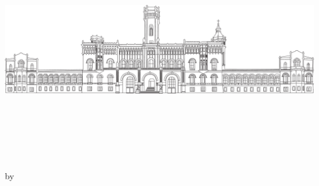 \begin{titlepage}
	\begin{addmargin}[-1cm]{-3cm}
	\vspace{1cm}
    \begin{center}
    	\includegraphics[width=13.8cm]{gfx/welfenschloss}
        \large  

        \hfill

        \begingroup
            \huge{}\LARGE{}
            \huge{}\LARGE{}
            \huge{}\LARGE{} \\
        \endgroup
		\smallskip
        \normalsize
        \myFaculty \\
        \myDepartment

        \vfill
        
        \LARGE {\color{LUHblue}\spacedallcaps \myTitle} \\
        \vfill
        \Large \myDegree \\
        \vfill
        
        \large by \\ %
        \smallskip
        \large \spacedallcaps{\myName} \\
        \smallskip
        \large \myTime \\ %
        

\end{center}
\end{addmargin}
\end{titlepage}
